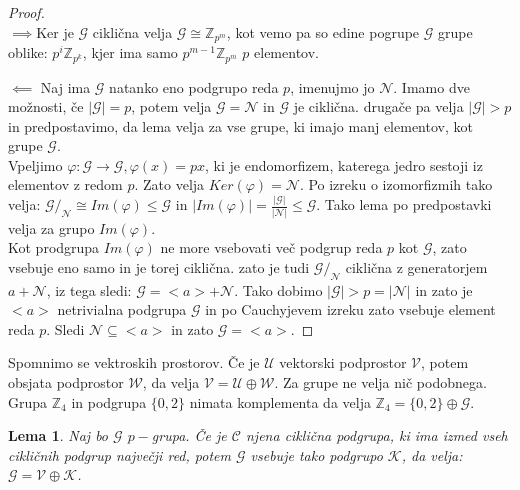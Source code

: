 \documentclass[a4paper]{article}
\newtheorem{lemma}{Lema}
\begin{document}
\begin{proof}\leavevmode\\
$\implies$Ker je $\mathcal{G}$ ciklična velja $\mathcal{G} \cong \mathbb{Z}_{p^m}$, kot vemo pa so edine pogrupe $\mathcal{G}$ grupe oblike: $p^i \mathbb{Z}_{p^k}$, kjer ima samo $p^{m-1}\mathbb{Z}_{p^m}$ $p$ elementov.


$\impliedby$ Naj ima $\mathcal{G}$ natanko eno podgrupo reda $p$, imenujmo jo $\mathcal{N}$. Imamo dve možnosti, če $|\mathcal{G}| = p$, potem velja $\mathcal{G} = \mathcal{N}$ in $\mathcal{G}$ je ciklična. drugače pa velja $|\mathcal{G}| > p$ in predpostavimo, da lema velja za vse grupe, ki imajo manj elementov, kot grupe $\mathcal{G}$.\\
Vpeljimo $\varphi: \mathcal{G} \to \mathcal{G}, \varphi(x) = px$, ki je endomorfizem, katerega jedro sestoji iz elementov z redom $p$. Zato velja $Ker (\varphi) = \mathcal{N}$. Po izreku o izomorfizmih tako velja: $\mathcal{G}/_{\mathcal{N}} \cong Im(\varphi) \leq \mathcal{G}$ in $|Im(\varphi)| = \frac{|\mathcal{G}|}{|\mathcal{N}|} \leq \mathcal{G}$. Tako lema po predpostavki velja za grupo $Im(\varphi)$.\\
Kot prodgrupa $Im(\varphi)$ ne more vsebovati več podgrup reda $p $ kot $\mathcal{G}$, zato vsebuje eno samo in je torej ciklična. zato je tudi $\mathcal{G}/_{\mathcal{N}}$ ciklična z generatorjem $a + \mathcal{N}$, iz tega sledi: $\mathcal{G} = <a> + \mathcal{N}$. Tako dobimo $|\mathcal{G}| > p = |\mathcal{N}|$ in zato je $<a>$ netrivialna podgrupa $\mathcal{G}$ in po Cauchyjevem izreku zato vsebuje element reda $p$. Sledi $\mathcal{N} \subseteq <a>$ in zato $\mathcal{G} = <a>$.
\end{proof}

Spomnimo se vektroskih prostorov. Če je $\mathcal{U}$ vektorski podprostor $\mathcal{V}$, potem obsjata podprostor $\mathcal{W}$, da velja $\mathcal{V} = \mathcal{U} \oplus \mathcal{W}$. Za grupe ne velja nič podobnega. Grupa $\mathbb{Z}_4$ in podgrupa $\{0,2\}$ nimata komplementa da velja $\mathbb{Z}_4 = \{0,2\} \oplus \mathcal{G}$.

\begin{lemma}
Naj bo $\mathcal{G}$ $p-$grupa. Če je $\mathcal{C}$ njena ciklična podgrupa, ki ima izmed vseh cikličnih podgrup največji red, potem $\mathcal{G}$ vsebuje tako podgrupo $\mathcal{K}$, da velja: $\mathcal{G} = \mathcal{V} \oplus \mathcal{K}$.
\end{lemma}
\end{document}

